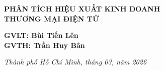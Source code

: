 \begin{titlepage}
\begin{center}
\vspace{0.8cm}

{\fontsize{16}{20}\selectfont\bfseries\color{navyblue}
PHÂN TÍCH HIỆU XUẤT KINH DOANH}\\[0.3cm]
{\fontsize{16}{20}\selectfont\bfseries\color{navyblue}
THƯƠNG MẠI ĐIỆN TỬ}

\end{center}

\vspace*{\fill}

\begin{flushleft}
{\fontsize{12}{16}\selectfont\bfseries\color{navyblue}
GVLT: Bùi Tiến Lên}\\[0.2cm]
{\fontsize{12}{16}\selectfont\bfseries\color{navyblue}
GVTH: Trần Huy Bân}
\end{flushleft}

\vspace{0.4cm}

\begin{flushright}
{\fontsize{11}{13}\selectfont\itshape\color{navyblue}
Thành phố Hồ Chí Minh, tháng 03, năm 2026}
\hspace{1.5cm}
\end{flushright}

\vspace{0.8cm}

\end{titlepage}
